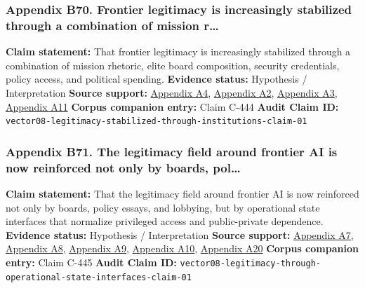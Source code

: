\documentclass[
  american,
  11pt,
  letterpaper,
]{article}
\begin{document}
\subsubsection{Appendix B70. Frontier legitimacy is increasingly
stabilized through a combination of mission
r\ldots{}}\label{appendix-b70-frontier-legitimacy-is-increasingly-stabilized-through-a-combination-of-mission-r}

\textbf{Claim statement:} That frontier legitimacy is increasingly
stabilized through a combination of mission rhetoric, elite board
composition, security credentials, policy access, and political
spending. \textbf{Evidence status:} Hypothesis / Interpretation
\textbf{Source support:}
\hyperref[appendix-a4-openai-announces-new-members-to-board-of-directors]{Appendix
A4},
\hyperref[appendix-a2-openai-appoints-former-top-us-cyberwarrior-paul-nakasone-to-its-board-of-directors]{Appendix
A2},
\hyperref[appendix-a3-anthropic-outspends-openai-in-biggest-ever-lobbying-quarter]{Appendix
A3},
\hyperref[appendix-a11-leading-the-future-committee-overview]{Appendix
A11} \textbf{Corpus companion entry:} Claim C-444 \textbf{Audit Claim
ID:}
\texttt{vector08-legitimacy-stabilized-through-institutions-claim-01}

\subsubsection{Appendix B71. The legitimacy field around frontier AI is
now reinforced not only by boards,
pol\ldots{}}\label{appendix-b71-the-legitimacy-field-around-frontier-ai-is-now-reinforced-not-only-by-boards-pol}

\textbf{Claim statement:} That the legitimacy field around frontier AI
is now reinforced not only by boards, policy essays, and lobbying, but
by operational state interfaces that normalize privileged access and
public-private dependence. \textbf{Evidence status:} Hypothesis /
Interpretation \textbf{Source support:}
\hyperref[appendix-a7-introducing-openai-for-government]{Appendix A7},
\hyperref[appendix-a8-claude-gov-models-for-u-s-national-security-customers]{Appendix
A8},
\hyperref[appendix-a9-anthropic-and-palantir-partner-to-bring-claude-ai-models-to-aws-for-u-s-government-intelligence-and-defense-operations]{Appendix
A9},
\hyperref[appendix-a10-army-launches-detachment-201-executive-innovation-corps-to-drive-tech-transformation]{Appendix
A10},
\hyperref[appendix-a20-openais-proposals-for-the-us-ai-action-plan]{Appendix
A20} \textbf{Corpus companion entry:} Claim C-445 \textbf{Audit Claim
ID:}
\texttt{vector08-legitimacy-through-operational-state-interfaces-claim-01}
\end{document}
